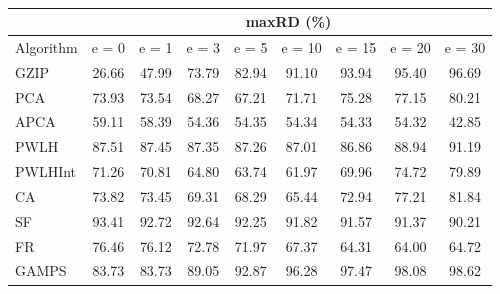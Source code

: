 \begin{table}[h]
\newcommand{\cpca}{\cellcolor{cyan!20}}
\newcommand{\capca}{\cellcolor{green!20}}
\newcommand{\cfr}{\cellcolor{yellow!25}}
\newcommand{\cgzip}{\cellcolor{orange!20}}
\newcommand{\best}{\cellcolor{gray!30}}
\centering\hspace*{0cm}\begin{tabular}{| l | c | c | c | c | c | c | c | c |}\cline{2-9}\multicolumn{1}{c|}{}& \multicolumn{8}{c|}{maxRD (\%)}\\\hline
{Algorithm} & {e = 0} & {e = 1} & {e = 3} & {e = 5} & {e = 10} & {e = 15} & {e = 20} & {e = 30} \\\hline
{GZIP\cgzip} & {\best26.66} & {\best47.99} & {73.79} & {82.94} & {91.10} & {93.94} & {95.40} & {96.69} \\\hline
{PCA\cpca} & {73.93} & {73.54} & {68.27} & {67.21} & {71.71} & {75.28} & {77.15} & {80.21} \\\hline
{APCA\capca} & {59.11} & {58.39} & {\best54.36} & {\best54.35} & {\best54.34} & {\best54.33} & {\best54.32} & {\best42.85} \\\hline
{PWLH} & {87.51} & {87.45} & {87.35} & {87.26} & {87.01} & {86.86} & {88.94} & {91.19} \\\hline
{PWLHInt} & {71.26} & {70.81} & {64.80} & {63.74} & {61.97} & {69.96} & {74.72} & {79.89} \\\hline
{CA} & {73.82} & {73.45} & {69.31} & {68.29} & {65.44} & {72.94} & {77.21} & {81.84} \\\hline
{SF} & {93.41} & {92.72} & {92.64} & {92.25} & {91.82} & {91.57} & {91.37} & {90.21} \\\hline
{FR\cfr} & {76.46} & {76.12} & {72.78} & {71.97} & {67.37} & {64.31} & {64.00} & {64.72} \\\hline
{GAMPS} & {83.73} & {83.73} & {89.05} & {92.87} & {96.28} & {97.47} & {98.08} & {98.62} \\\hline
\end{tabular}
\caption{\captionminmaxtwo}
\label{experiments:minmaxtwo}
\end{table}
